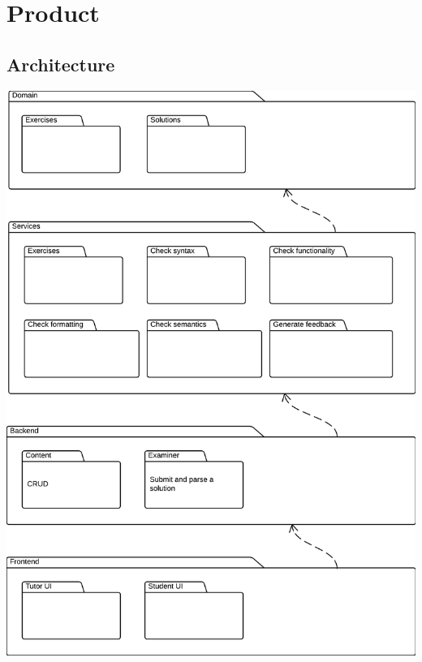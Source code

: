 
\chapter{Product}
\section{Architecture}
\includegraphics[scale=0.55] {diagrams-images/architecture}
